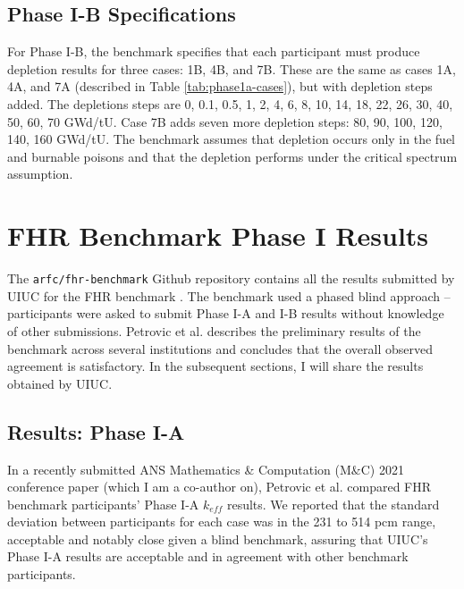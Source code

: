 \subsection{Phase I-B Specifications}
For Phase I-B, the benchmark specifies that each participant must produce 
depletion results for three cases: 1B, 4B, and 7B. 
These are the same as cases 1A, 4A, and 7A (described in Table \ref{tab:phase1a-cases}), 
but with depletion steps added. 
The depletions steps are 0, 0.1, 0.5, 1, 2, 4, 6, 8, 10, 14, 18, 22, 26, 30, 40, 50, 
60, 70 GWd/tU. 
Case 7B adds seven more depletion steps: 80, 90, 100, 120, 140, 160 GWd/tU. 
The benchmark assumes that depletion occurs only in the fuel and burnable poisons 
and that the depletion performs under the critical spectrum assumption. 

\section{FHR Benchmark Phase I Results}
The \texttt{arfc/fhr-benchmark} Github repository contains all the results submitted 
by \gls{UIUC} for the \gls{FHR} benchmark \cite{chee_arfcfhr-benchmark_2021}. 
The benchmark used a phased blind approach -- participants were asked to 
submit Phase I-A and I-B results without knowledge of other submissions. 
Petrovic et al. \cite{petrovic_preliminary_2021} describes the preliminary 
results of the benchmark across several institutions and concludes 
that the overall observed agreement is satisfactory. 
In the subsequent sections, I will share the results obtained by \gls{UIUC}. 

\subsection{Results: Phase I-A}
In a recently submitted \gls{ANS} Mathematics \& Computation (M$\&$C) 2021 conference paper 
(which I am a co-author on), Petrovic et al. \cite{petrovic_preliminary_2021} compared 
\gls{FHR} benchmark participants' Phase I-A $k_{eff}$ results.  
We reported that the standard deviation between participants for each case 
was in the 231 to 514 pcm range, acceptable and notably close given a blind 
benchmark, assuring that \gls{UIUC}'s Phase I-A results are acceptable and 
in agreement with other benchmark participants. 

